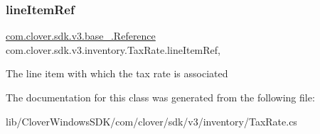 \subsubsection{\texorpdfstring{line\+Item\+Ref}{lineItemRef}}
{\footnotesize\ttfamily \hyperlink{classcom_1_1clover_1_1sdk_1_1v3_1_1base___1_1_reference}{com.\+clover.\+sdk.\+v3.\+base\+\_\+.\+Reference} com.\+clover.\+sdk.\+v3.\+inventory.\+Tax\+Rate.\+line\+Item\+Ref\hspace{0.3cm}{\ttfamily [get]}, {\ttfamily [set]}}



The line item with which the tax rate is associated 



The documentation for this class was generated from the following file\+:\begin{DoxyCompactItemize}
\item 
lib/\+Clover\+Windows\+S\+D\+K/com/clover/sdk/v3/inventory/Tax\+Rate.\+cs\end{DoxyCompactItemize}
